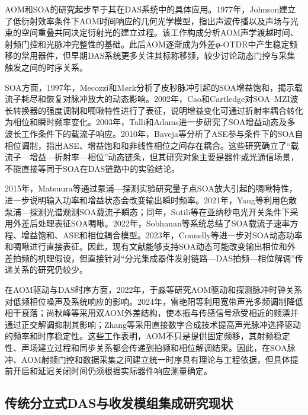 AOM和SOA的研究起步早于其在DAS系统中的具体应用。1977年，Johnson建立了低衍射效率条件下AOM时间响应的几何光学模型，指出声波传播以及声场与光束的空间重叠共同决定衍射光的建立过程\cite{johnson1977aom}。该工作构成分析AOM声学渡越时间、射频门控和光脉冲完整性的基础。此后AOM逐渐成为外差φ-OTDR中产生稳定频移的常用器件，但早期DAS系统更多关注其标称移频，较少讨论动态门控与采集触发之间的时序关系。

SOA方面，1997年，Mecozzi和M{\o}rk分析了皮秒脉冲引起的SOA增益饱和，揭示载流子耗尽和恢复对脉冲放大的动态影响\cite{mecozzi1997saturation}。2002年，Cao和Cartledge对SOA--MZI波长转换器的强度调制和啁啾特性进行了表征，说明增益变化可通过折射率耦合转化为相位和瞬时频率变化\cite{cao2002characterization}。2003年，Talli和Adams进一步研究了SOA增益动态及多波长工作条件下的载流子响应\cite{talli2003gain}。2010年，Baveja等分析了ASE参与条件下的SOA自相位调制，指出ASE、增益饱和和非线性相位之间存在耦合\cite{baveja2010selfphase}。这些研究确立了“载流子—增益—折射率—相位”动态链条，但其研究对象主要是器件或光通信场景，不能直接等同于SOA在DAS链路中的实验结论。

2015年，Matsuura等通过泵浦—探测实验研究量子点SOA放大引起的啁啾特性，进一步说明输入功率和增益状态会改变输出瞬时频率\cite{matsuura2015chirp}。2021年，Yang等利用色散泵浦—探测光谱观测SOA载流子瞬态\cite{yang2021carrier}；同年，Sutili等在亚纳秒电光开关条件下采用外差后处理表征SOA啁啾\cite{sutili2021chirp}。2022年，Sobhanan等系统总结了SOA载流子速率方程、增益饱和、ASE和相位耦合模型\cite{sobhanan2022soa}。2023年，Connelly等进一步对SOA动态功率和啁啾进行直接表征\cite{connelly2023dynamic}。因此，现有文献能够支持SOA动态可能改变输出相位和外差拍频的机理假设，但直接针对“分光集成器件发射链路—DAS拍频—相位解调”传递关系的研究仍较少。

在AOM驱动与DAS时序方面，2022年，于淼等研究AOM驱动和探测脉冲时钟关系对低频相位噪声及系统响应的影响\cite{yu2022lowfrequency_cn}。2024年，雷艳阳等利用宽带声光多频调制降低相干衰落\cite{lei2024broadband_cn}；尚秋峰等采用双AOM外差结构，使本振与传感信号承受相近的频漂并通过正交解调抑制其影响\cite{shang2024dualaom_cn}；Zhang等采用直接数字合成技术提高声光脉冲选择驱动的频率和时序稳定性\cite{zhang2024highprecision}。这些工作表明，AOM不只是提供固定频移，其射频稳定性、声场建立过程和同步关系都会传递到拍频和相位解调结果。因此，在SOA脉冲、AOM射频门控和数据采集之间建立统一时序具有理论与工程依据，但具体提前开启和延迟关闭时间仍须根据实际器件响应测量确定。

\subsection{传统分立式DAS与收发模组集成研究现状}


